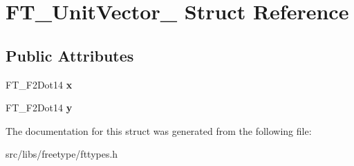 \hypertarget{struct_f_t___unit_vector__}{
\section{FT\_\-UnitVector\_\- Struct Reference}
\label{struct_f_t___unit_vector__}
}
\subsection*{Public Attributes}
\begin{DoxyCompactItemize}
\item 
\hypertarget{struct_f_t___unit_vector___a03c9f8ae35a5ad1bcac49995a9dac714}{
FT\_\-F2Dot14 {\bfseries x}}
\label{struct_f_t___unit_vector___a03c9f8ae35a5ad1bcac49995a9dac714}

\item 
\hypertarget{struct_f_t___unit_vector___a12eb9ad5c47614f5f2d3f9e401933d0e}{
FT\_\-F2Dot14 {\bfseries y}}
\label{struct_f_t___unit_vector___a12eb9ad5c47614f5f2d3f9e401933d0e}

\end{DoxyCompactItemize}


The documentation for this struct was generated from the following file:\begin{DoxyCompactItemize}
\item 
src/libs/freetype/fttypes.h\end{DoxyCompactItemize}
